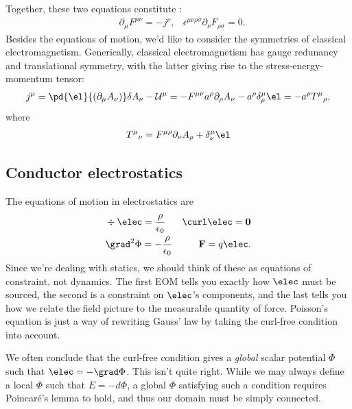 \documentclass[11pt]{article}
\begin{document}
Together, these two equations constitute :
\begin{align*}
    & \boxed{\partial_\mu F^{\mu \nu} = - j^\nu,}
    & \boxed{\epsilon^{\mu \nu \rho \sigma} \partial_\nu F_{\rho \sigma} = 0.}
\end{align*}
Besides the equations of motion, we'd like to consider the symmetries of classical
electromagnetism. Generically, classical electromagnetism has gauge redunancy and
translational symmetry, with the latter giving rise to the stress-energy-momentum
tensor:
\begin{align*}
    j^\mu = \pd{\el}{(\partial_\mu A_\nu)} \delta A_\nu - \mathcal{U}^\mu = - F^{\mu \nu} a^\rho \partial_\rho A_\nu - a^\rho \delta^\mu_{\rho} \el = - a^\rho T^\mu{}_\rho,
\end{align*}
where
\begin{align*}
    T^\mu{}_\nu = F^{\mu \rho} \partial_\nu A_\rho + \delta^{\mu}_\nu \el
\end{align*}




\subsection{Conductor electrostatics}

The equations of motion in electrostatics are
\begin{align*}
    & \div \elec = \frac{\rho}{\epsilon_0}
    & \curl \elec = \mathbf{0}\\
    & \grad^2 \Phi = - \frac{\rho}{\epsilon_0}
    & \mathbf{F} = q \elec.
\end{align*}
Since we're dealing with statics, we should think of these as equations of constraint,
not dynamics. The first EOM tells you exactly how $\elec$ must be sourced,
the second is a constraint on $\elec$'s components,
and the last tells you how we relate the field picture
to the measurable quantity of force. Poisson's equation
is just a way of rewriting Gauss' law by taking the curl-free
condition into account.

\begin{reemark}
    [On $\curl \elec = \mathbf{0} \implies \elec = - \grad \Phi$]
    We often conclude that the curl-free condition gives a \emph{global} 
    scalar potential $\Phi$ such that $\elec = - \grad \Phi$. This isn't quite
    right. While we may always define a local $\Phi$ such that $E = - d \Phi$,
    a global $\Phi$ satisfying such a condition requires Poincar\'e's lemma
    to hold, and thus our domain must be simply connected.
\end{reemark}
\end{document}
